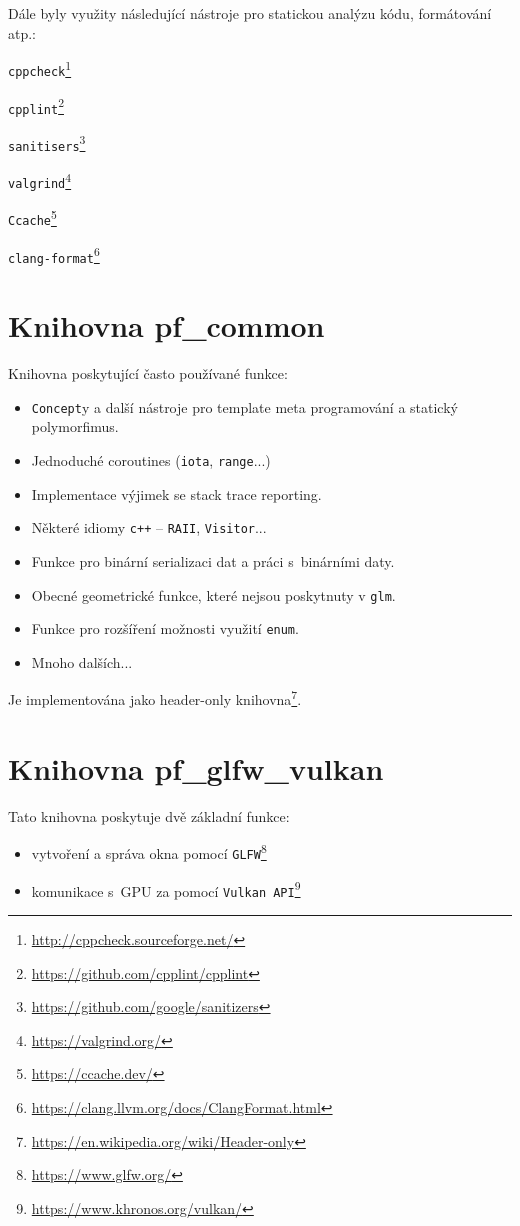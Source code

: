 Dále byly využity následující nástroje pro statickou analýzu kódu, formátování atp.:
\begin{itemize}
\end{itemize}

\section{Knihovna pf\_common}
Knihovna poskytující často používané funkce:
\begin{itemize}
	\item \texttt{Concept}y a další nástroje pro template meta programování a statický polymorfimus.
	\item Jednoduché coroutines (\texttt{iota}, \texttt{range}...)
	\item Implementace výjimek se stack trace reporting.
	\item Některé idiomy \texttt{c++} -- \texttt{RAII}, \texttt{Visitor}...
	\item Funkce pro binární serializaci dat a práci s~binárními daty.
	\item Obecné geometrické funkce, které nejsou poskytnuty v \texttt{glm}.
	\item Funkce pro rozšíření možnosti využití \texttt{enum}.
	\item Mnoho dalších...
\end{itemize}

Je implementována jako header-only knihovna\footnote{\url{https://en.wikipedia.org/wiki/Header-only}}.

\section{Knihovna pf\_glfw\_vulkan}
Tato knihovna poskytuje dvě základní funkce:
\begin{itemize}
	\item vytvoření a správa okna pomocí \texttt{GLFW}\footnote{\url{https://www.glfw.org/}}
	\item komunikace s~GPU za pomocí \texttt{Vulkan API}\footnote{\url{https://www.khronos.org/vulkan/}}
\end{itemize}

